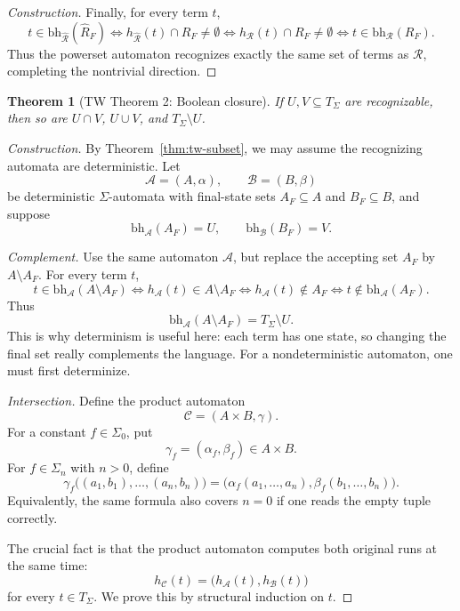 \documentclass[11pt]{article}
\newtheorem{theorem}{Theorem}
\theoremstyle{definition}
\newcommand{\SigmaSym}{\Sigma}
\newcommand{\Term}[1]{T_{#1}}
\newcommand{\Aut}{\mathcal A}
\newcommand{\NAut}{\mathcal R}
\newcommand{\bh}{\mathrm{bh}}
\begin{document}
\begin{proof}[Construction]
Finally, for every term \(t\),
\[
  t\in\bh_{\widehat{\NAut}}(\widehat R_F)
  \Longleftrightarrow
  h_{\widehat{\NAut}}(t)\cap R_F\neq\emptyset
  \Longleftrightarrow
  h_\NAut(t)\cap R_F\neq\emptyset
  \Longleftrightarrow
  t\in\bh_\NAut(R_F).
\]
Thus the powerset automaton recognizes exactly the same set of terms as
\(\NAut\), completing the nontrivial direction.
\end{proof}

\begin{theorem}[TW Theorem 2: Boolean closure]\label{thm:tw-boolean}
If \(U,V\subseteq\Term{\SigmaSym}\) are recognizable, then so are
\(U\cap V\), \(U\cup V\), and \(\Term{\SigmaSym}\setminus U\).
\end{theorem}

\begin{proof}[Construction]
By Theorem~\ref{thm:tw-subset}, we may assume the recognizing automata are
deterministic.  Let
\[
  \Aut=(A,\alpha),\qquad \mathcal B=(B,\beta)
\]
be deterministic \(\SigmaSym\)-automata with final-state sets
\(A_F\subseteq A\) and \(B_F\subseteq B\), and suppose
\[
  \bh_\Aut(A_F)=U,\qquad \bh_{\mathcal B}(B_F)=V.
\]

\emph{Complement.}  Use the same automaton \(\Aut\), but replace the accepting
set \(A_F\) by \(A\setminus A_F\).  For every term \(t\),
\[
  t\in\bh_\Aut(A\setminus A_F)
  \Longleftrightarrow
  h_\Aut(t)\in A\setminus A_F
  \Longleftrightarrow
  h_\Aut(t)\notin A_F
  \Longleftrightarrow
  t\notin\bh_\Aut(A_F).
\]
Thus
\[
  \bh_\Aut(A\setminus A_F)=\Term{\SigmaSym}\setminus U.
\]
This is why determinism is useful here: each term has one state, so changing the
final set really complements the language.  For a nondeterministic automaton,
one must first determinize.

\emph{Intersection.}  Define the product automaton
\[
  \mathcal C=(A\times B,\gamma).
\]
For a constant \(f\in\SigmaSym_0\), put
\[
  \gamma_f=(\alpha_f,\beta_f)\in A\times B.
\]
For \(f\in\SigmaSym_n\) with \(n>0\), define
\[
  \gamma_f\bigl((a_1,b_1),\ldots,(a_n,b_n)\bigr)
  =
  \bigl(\alpha_f(a_1,\ldots,a_n),\beta_f(b_1,\ldots,b_n)\bigr).
\]
Equivalently, the same formula also covers \(n=0\) if one reads the empty tuple
correctly.

The crucial fact is that the product automaton computes both original runs at
the same time:
\[
  h_{\mathcal C}(t)=\bigl(h_\Aut(t),h_{\mathcal B}(t)\bigr)       \tag{\(*\)}
\]
for every \(t\in\Term{\SigmaSym}\).  We prove this by structural induction on
\(t\).


\end{proof}
\end{document}
